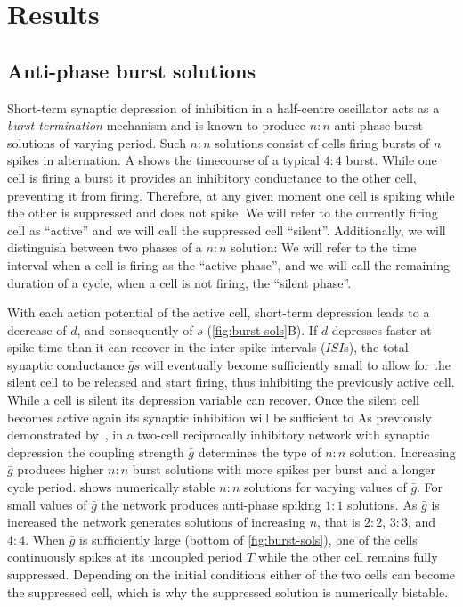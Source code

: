 \section{Results}
\subsection{Anti-phase burst solutions}
Short-term synaptic depression of inhibition in a half-centre oscillator acts as a \emph{burst termination} mechanism \citep{brown1911} and is known to produce $n:n$ anti-phase burst solutions of varying period.
Such $n:n$ solutions consist of cells firing bursts of $n$ spikes in alternation.
A shows the timecourse of a typical $4:4$ burst.
While one cell is firing a burst it provides an inhibitory conductance to the other cell,  preventing it from firing.
Therefore, at any given moment one cell is spiking while the other is suppressed and does not spike.
We will refer to the currently firing cell as ``active'' and we will call the suppressed cell ``silent''.
Additionally, we will distinguish between two phases of a $n:n$ solution:
We will refer to the time interval when a cell is firing as the ``active phase'', and we will call the remaining duration of a cycle, when a cell is not firing, the ``silent  phase''.

With each action potential of the active cell, short-term depression leads to a decrease of $d$, and consequently of $s$ (\cref{fig:burst-sols}B).
If $d$ depresses faster at spike time than it can recover in the inter-spike-intervals ($ISI$s), the total synaptic conductance $\bar g s$ will eventually become sufficiently small to allow for the silent cell to be released \citep{wang1992,skinner1994} and start firing, thus inhibiting the previously active cell.
While a cell is silent its depression variable can recover.
Once the silent cell becomes active again its synaptic inhibition will be sufficient to As previously demonstrated by~\citet{bose2011}, in a two-cell reciprocally inhibitory network with synaptic depression the coupling strength $\bar g$ determines the type of $n:n$ solution.
Increasing $\bar g$ produces higher $n:n$ burst solutions with more spikes per burst and a longer cycle period.
 shows numerically stable $n:n$ solutions for varying values of $\bar g$.
For small values of $\bar g$ the network produces anti-phase spiking $1:1$ solutions.
As $\bar g$ is increased the network generates solutions of increasing $n$, that is $2:2$, $3:3$, and $4:4$.
When $\bar g$ is sufficiently large (bottom of \cref{fig:burst-sols}), one of the cells continuously spikes at its uncoupled period $T$ while the other cell remains fully suppressed.
Depending on the initial conditions either of the two cells can become the suppressed cell, which is why the suppressed solution is numerically bistable.

